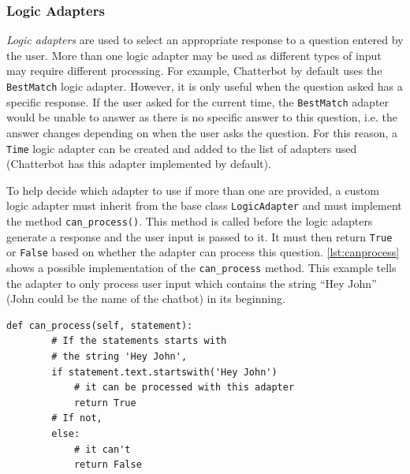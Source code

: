 \documentclass[12pt,a4paper]{article}
\newcommand{\captionstyle}[1] {
    \small{#1}
}
\begin{document}
\subsubsection{Logic Adapters}
\textit{Logic adapters} are used to select an appropriate response to a question entered by the user. More than one logic adapter may be used as different types of input may require different processing. For example, Chatterbot by default uses the \texttt{BestMatch} logic adapter. However, it is only useful when the question asked has a specific response. If the user asked for the current time, the \texttt{BestMatch} adapter would be unable to answer as there is no specific answer to this question, i.e. the answer changes depending on when the user asks the question. For this reason, a \texttt{Time} logic adapter can be created and added to the list of adapters used (Chatterbot has this adapter implemented by default). 

To help decide which adapter to use if more than one are provided, a custom logic adapter must inherit from the base class \texttt{LogicAdapter} and must implement the method \texttt{can\_process()}. This method is called before the logic adapters generate a response and the user input is passed to it. It must then return \texttt{True} or \texttt{False} based on whether the adapter can process this question. \cref{lst:canprocess} shows a possible implementation of the \texttt{can\_process} method. This example tells the adapter to only process user input which contains the string \enquote{Hey John} (John could be the name of the chatbot) in its beginning.

\begin{lstlisting}[caption={\captionstyle{Example implementation of the \texttt{can\_process()} method. Adapted from \citep{Chatterbot:online}.}}, label={lst:canprocess}]
    def can_process(self, statement):
        # If the statements starts with
        # the string 'Hey John',
        if statement.text.startswith('Hey John')
            # it can be processed with this adapter
            return True
        # If not,
        else:
            # it can't
            return False
\end{lstlisting}
\end{document}
